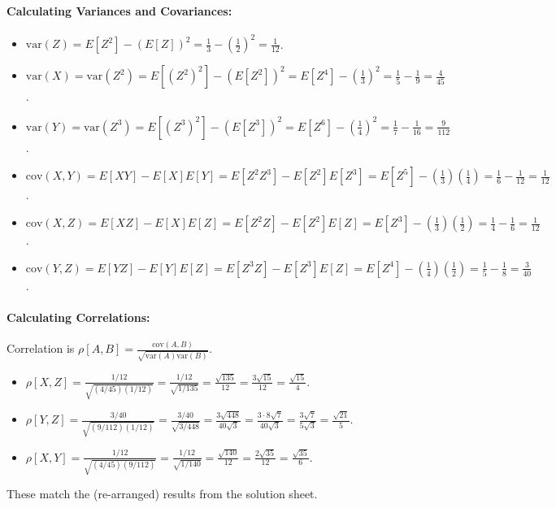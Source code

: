 \documentclass[11pt,a4paper]{article}
\begin{document}
\paragraph{Calculating Variances and Covariances:}
\begin{itemize}
    \item $\text{var}(Z) = E[Z^2] - (E[Z])^2 = \frac{1}{3} - (\frac{1}{2})^2 = \frac{1}{12}$.
    \item $\text{var}(X) = \text{var}(Z^2) = E[(Z^2)^2] - (E[Z^2])^2 = E[Z^4] - (\frac{1}{3})^2 = \frac{1}{5} - \frac{1}{9} = \frac{4}{45}$.
    \item $\text{var}(Y) = \text{var}(Z^3) = E[(Z^3)^2] - (E[Z^3])^2 = E[Z^6] - (\frac{1}{4})^2 = \frac{1}{7} - \frac{1}{16} = \frac{9}{112}$.
    \item $\text{cov}(X, Y) = E[XY] - E[X]E[Y] = E[Z^2 Z^3] - E[Z^2]E[Z^3] = E[Z^5] - (\frac{1}{3})(\frac{1}{4}) = \frac{1}{6} - \frac{1}{12} = \frac{1}{12}$.
    \item $\text{cov}(X, Z) = E[XZ] - E[X]E[Z] = E[Z^2 Z] - E[Z^2]E[Z] = E[Z^3] - (\frac{1}{3})(\frac{1}{2}) = \frac{1}{4} - \frac{1}{6} = \frac{1}{12}$.
    \item $\text{cov}(Y, Z) = E[YZ] - E[Y]E[Z] = E[Z^3 Z] - E[Z^3]E[Z] = E[Z^4] - (\frac{1}{4})(\frac{1}{2}) = \frac{1}{5} - \frac{1}{8} = \frac{3}{40}$.
\end{itemize}

\paragraph{Calculating Correlations:}
Correlation is $\rho[A, B] = \frac{\text{cov}(A,B)}{\sqrt{\text{var}(A)\text{var}(B)}}$.
\begin{itemize}
    \item $\rho[X, Z] = \frac{1/12}{\sqrt{(4/45)(1/12)}} = \frac{1/12}{\sqrt{1/135}} = \frac{\sqrt{135}}{12} = \frac{3\sqrt{15}}{12} = \frac{\sqrt{15}}{4}$.
    \item $\rho[Y, Z] = \frac{3/40}{\sqrt{(9/112)(1/12)}} = \frac{3/40}{\sqrt{3/448}} = \frac{3\sqrt{448}}{40\sqrt{3}} = \frac{3 \cdot 8\sqrt{7}}{40\sqrt{3}} = \frac{3\sqrt{7}}{5\sqrt{3}} = \frac{\sqrt{21}}{5}$.
    \item $\rho[X, Y] = \frac{1/12}{\sqrt{(4/45)(9/112)}} = \frac{1/12}{\sqrt{1/140}} = \frac{\sqrt{140}}{12} = \frac{2\sqrt{35}}{12} = \frac{\sqrt{35}}{6}$.
\end{itemize}
These match the (re-arranged) results from the solution sheet.
\end{document}
